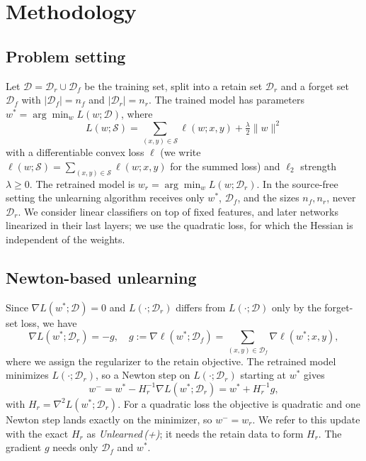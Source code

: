 \documentclass[10pt,twocolumn,letterpaper]{article}
\newcommand{\Dr}{\mathcal{D}_r}
\newcommand{\Df}{\mathcal{D}_f}
\newcommand{\Hr}{H_r}
\newcommand{\wstar}{w^{*}}
\newcommand{\wminus}{w^{-}}
\newcommand{\norm}[1]{\lVert #1\rVert}
\begin{document}
\section{Methodology}
\label{sec:method}
\subsection{Problem setting}
Let $\mathcal{D}=\Dr\cup\Df$ be the training set, split into a retain set $\Dr$ and a forget set $\Df$ with $|\Df|=n_f$ and $|\Dr|=n_r$. The trained model has parameters $\wstar=\arg\min_w L(w;\mathcal{D})$, where
\begin{equation}
  L(w;\mathcal{S})=\sum_{(x,y)\in\mathcal{S}}\ell(w;x,y)+\tfrac{\lambda}{2}\norm{w}^2
  \label{eq:objective}
\end{equation}
with a differentiable convex loss $\ell$ (we write $\ell(w;\mathcal{S})=\sum_{(x,y)\in\mathcal{S}}\ell(w;x,y)$ for the summed loss) and $\ell_2$ strength $\lambda\ge 0$. The retrained model is $w_r=\arg\min_w L(w;\Dr)$. In the source-free setting the unlearning algorithm receives only $\wstar$, $\Df$, and the sizes $n_f,n_r$, never $\Dr$. We consider linear classifiers on top of fixed features, and later networks linearized in their last layers; we use the quadratic loss, for which the Hessian is independent of the weights.

\subsection{Newton-based unlearning}
Since $\nabla L(\wstar;\mathcal{D})=0$ and $L(\cdot;\Dr)$ differs from $L(\cdot;\mathcal{D})$ only by the forget-set loss, we have
\begin{equation}
  \nabla L(\wstar;\Dr)=-g,\quad g:=\nabla\ell(\wstar;\Df)=\!\!\sum_{(x,y)\in\Df}\!\!\nabla\ell(\wstar;x,y),
  \label{eq:grad_retain}
\end{equation}
where we assign the regularizer to the retain objective. The retrained model minimizes $L(\cdot;\Dr)$, so a Newton step on $L(\cdot;\Dr)$ starting at $\wstar$ gives
\begin{equation}
  \wminus=\wstar-\Hr^{-1}\nabla L(\wstar;\Dr)=\wstar+\Hr^{-1}g,
  \label{eq:newton}
\end{equation}
with $\Hr=\nabla^2L(\wstar;\Dr)$. For a quadratic loss the objective is quadratic and one Newton step lands exactly on the minimizer, so $\wminus=w_r$. We refer to this update with the exact $\Hr$ as \emph{Unlearned\,(+)}; it needs the retain data to form $\Hr$. The gradient $g$ needs only $\Df$ and $\wstar$.
\end{document}
